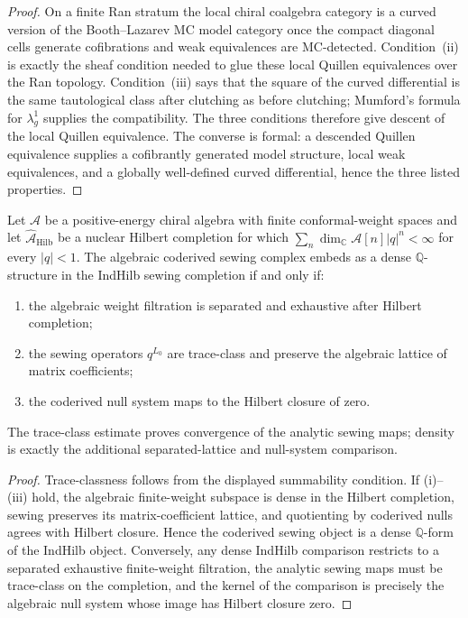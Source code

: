 \documentclass[11pt]{article}
\newcommand{\cA}{\mathcal{A}}
\newcommand{\C}{\mathbb{C}}
\begin{document}
\begin{proof}
On a finite Ran stratum the local chiral coalgebra category is a
curved version of the Booth--Lazarev MC model category once the
compact diagonal cells generate cofibrations and weak
equivalences are MC-detected.  Condition~(ii) is exactly the
sheaf condition needed to glue these local Quillen equivalences
over the Ran topology.  Condition~(iii) says that the square of
the curved differential is the same tautological class after
clutching as before clutching; Mumford's formula for
$\lambda_g^1$ supplies the compatibility.  The three conditions
therefore give descent of the local Quillen equivalence.  The
converse is formal: a descended Quillen equivalence supplies a
cofibrantly generated model structure, local weak equivalences,
and a globally well-defined curved differential, hence the three
listed properties.
\end{proof}

\begin{theorem}
\label{thm:dense-indhilb-sewing-comparison}
Let $\cA$ be a positive-energy chiral algebra with finite
conformal-weight spaces and let $\widehat{\cA}_{\mathrm{Hilb}}$
be a nuclear Hilbert completion for which
$\sum_n \dim_\C \cA[n]|q|^n<\infty$ for every $|q|<1$.  The
algebraic coderived sewing complex embeds as a dense
$\mathbb Q$-structure in the IndHilb sewing completion if and
only if:
\begin{enumerate}[label=\textup{(\roman*)},nosep]
\item the algebraic weight filtration is separated and exhaustive
after Hilbert completion;
\item the sewing operators $q^{L_0}$ are trace-class and preserve
the algebraic lattice of matrix coefficients;
\item the coderived null system maps to the Hilbert closure of
zero.
\end{enumerate}
The trace-class estimate proves convergence of the analytic
sewing maps; density is exactly the additional separated-lattice
and null-system comparison.
\end{theorem}

\begin{proof}
Trace-classness follows from the displayed summability condition.
If (i)--(iii) hold, the algebraic finite-weight subspace is dense
in the Hilbert completion, sewing preserves its matrix-coefficient
lattice, and quotienting by coderived nulls agrees with Hilbert
closure.  Hence the coderived sewing object is a dense
$\mathbb Q$-form of the IndHilb object.  Conversely, any dense
IndHilb comparison restricts to a separated exhaustive
finite-weight filtration, the analytic sewing maps must be
trace-class on the completion, and the kernel of the comparison
is precisely the algebraic null system whose image has Hilbert
closure zero.
\end{proof}
\end{document}
